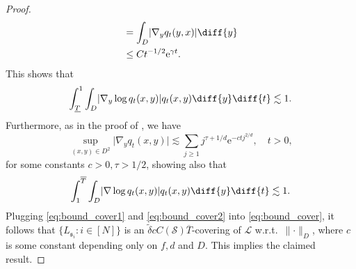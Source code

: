 \documentclass[a4paper, 11pt, headings = small, abstract]{scrartcl}
\begin{document}
\begin{proof}
\begin{equation}
\begin{split}
&= \int_D \lvert \nabla_y q_t(y,x) \rvert \diff{y} \\
&\leq Ct^{-1/2} \mathrm{e}^{\gamma t}.
\end{split}
\end{equation}
This shows that
\begin{equation} \label{eq:bound_cover1}
\int_{\underline{T}}^{1} \int_D  \lvert \nabla_y \log q_t(x,y) \rvert q_t(x,y) \diff{y} \diff{t} \lesssim 1.
\end{equation}
Furthermore, as in the proof of \cite[Proposition 3]{nickl23}, we have 
\begin{equation}\label{eq:grad_bound}
\sup_{(x,y) \in D^2} \lvert \nabla_y q_t(x,y) \rvert \lesssim \sum_{j \geq 1} j^{\tau +1/d}\mathrm{e}^{-ctj^{2/d}}, \quad t > 0,
\end{equation}
for some constants $c > 0, \tau > 1/2$, showing also that
\begin{equation}\label{eq:bound_cover2}
\int_1^{\overline{T}}  \int_D  \lvert \nabla \log q_t(x,y) \rvert q_t(x,y) \diff{y} \diff{t} \lesssim 1.
\end{equation}
Plugging \eqref{eq:bound_cover1} and \eqref{eq:bound_cover2} into \eqref{eq:bound_cover}, it follows that $\{L_{\mathfrak{s}_i}: i \in [N]\}$ is an $\tilde{\delta}cC(\mathcal{S})\overline{T}$-covering of $\mathcal{L}$ w.r.t.\ $\lVert \cdot  \rVert_D$, where $c$ is some constant depending only on $f,d$ and $D$. This implies the claimed result.
\end{proof}
\end{document}
